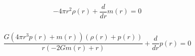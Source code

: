 \documentclass[11pt]{article}
\begin{document}
    $$- 4 \pi r^{2} \rho{\left(r \right)} + \frac{d}{d r} m{\left(r \right)}=0$$

    
    \begin{Verbatim}[commandchars=\\\{\}]

    \end{Verbatim}

    $$\frac{G \left(4 \pi r^{3} p{\left(r \right)} + m{\left(r \right)}\right) \left(\rho{\left(r \right)} + p{\left(r \right)}\right)}{r \left(- 2 G m{\left(r \right)} + r\right)} + \frac{d}{d r} p{\left(r \right)}=0$$

    

    
    
    
\end{document}
